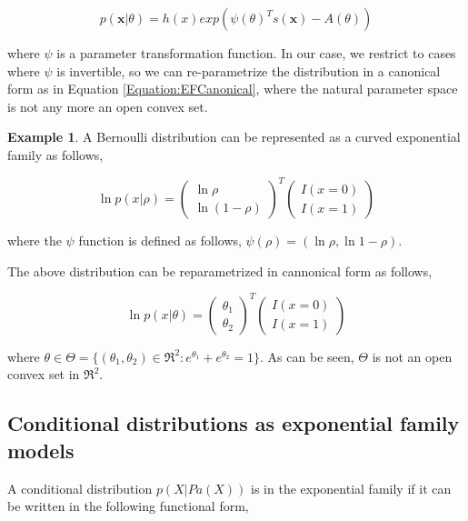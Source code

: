 \documentclass[11pt, oneside]{article}   	%
\newcommand{\bm}{\mathbf}
\numberwithin{figure}{section}
\numberwithin{equation}{section}
\numberwithin{table}{section}
\theoremstyle{definition}
\newtheorem{exmp}{Example}[section]
\begin{document}
\begin{equation*}
p(\bm x |\theta) = h(x) exp(\psi(\theta)^Ts(\bm x) -
A(\theta) )
\end{equation*}

\noindent where $\psi$ is a parameter transformation function. In our case, we restrict to cases where $\psi$ is invertible, so we can re-parametrize the distribution in a canonical form as in Equation \ref{Equation:EFCanonical}, where the natural parameter space is not any more an open convex set.


\begin{exmp}

A Bernoulli distribution can be represented as a curved exponential family as follows, 


$$
\ln p(x| \rho ) = 
\begin{pmatrix}
\ln \rho\\
\ln (1-\rho)
\end{pmatrix}^T
\begin{pmatrix}
I(x=0)\\
I(x=1)
\end{pmatrix}
$$

\noindent where the $\psi$ function is defined as follows, $\psi(\rho) = (\ln \rho, \ln 1-\rho)$. 

The above distribution can be reparametrized in cannonical form as follows, 

$$
\ln p(x| \theta ) = 
\begin{pmatrix}
\theta_1\\
\theta_2
\end{pmatrix}^T
\begin{pmatrix}
I(x=0)\\
I(x=1)
\end{pmatrix}
$$

\noindent where $\theta\in\Theta = \{ (\theta_1, \theta_2) \in \Re^2 : e^{\theta_1} + e^{\theta_2} = 1\}$.  As can be seen, $\Theta$ is not an open convex set in $\Re^2$. 

\end{exmp}

\subsection*{Conditional distributions as exponential family models} \label{sec:CondDist}

A conditional distribution $p(X|Pa(X))$ is in the exponential family if it can be written in the following functional form, 
\end{document}
